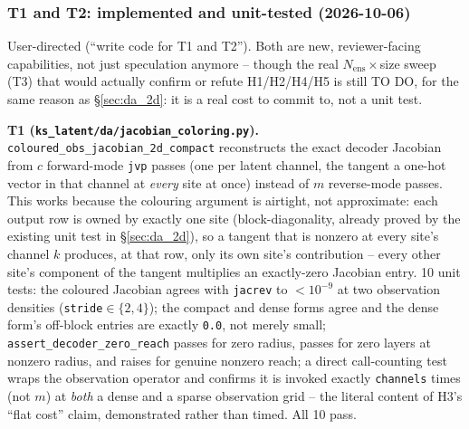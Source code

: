 \documentclass[11pt]{article}
\begin{document}
\subsubsection*{T1 and T2: implemented and unit-tested (2026-10-06)}
User-directed (``write code for T1 and T2''). Both are new,
reviewer-facing capabilities, not just speculation anymore -- though the
real $N_{\mathrm{ens}}\times$size sweep (T3) that would actually confirm
or refute H1/H2/H4/H5 is still TO DO, for the same reason as
\S\ref{sec:da_2d}: it is a real cost to commit to, not a unit test.

\textbf{T1 (\texttt{ks\_latent/da/jacobian\_coloring.py}).}
\texttt{coloured\_obs\_jacobian\_2d\_compact} reconstructs the exact
decoder Jacobian from $c$ forward-mode \texttt{jvp} passes (one per
latent channel, the tangent a one-hot vector in that channel at
\emph{every} site at once) instead of $m$ reverse-mode passes. This
works because the colouring argument is airtight, not approximate: each
output row is owned by exactly one site (block-diagonality, already
proved by the existing unit test in \S\ref{sec:da_2d}), so a tangent
that is nonzero at every site's channel $k$ produces, at that row, only
its own site's contribution -- every other site's component of the
tangent multiplies an exactly-zero Jacobian entry. 10 unit tests: the
coloured Jacobian agrees with \texttt{jacrev} to $<10^{-9}$ at two
observation densities (\texttt{stride}$\in\{2,4\}$); the compact and
dense forms agree and the dense form's off-block entries are exactly
\texttt{0.0}, not merely small; \texttt{assert\_decoder\_zero\_reach}
passes for zero radius, passes for zero layers at nonzero radius, and
raises for genuine nonzero reach; a direct call-counting test wraps the
observation operator and confirms it is invoked exactly \texttt{channels}
times (not $m$) at \emph{both} a dense and a sparse observation grid --
the literal content of H3's ``flat cost'' claim, demonstrated rather than
timed. All 10 pass.
\end{document}
